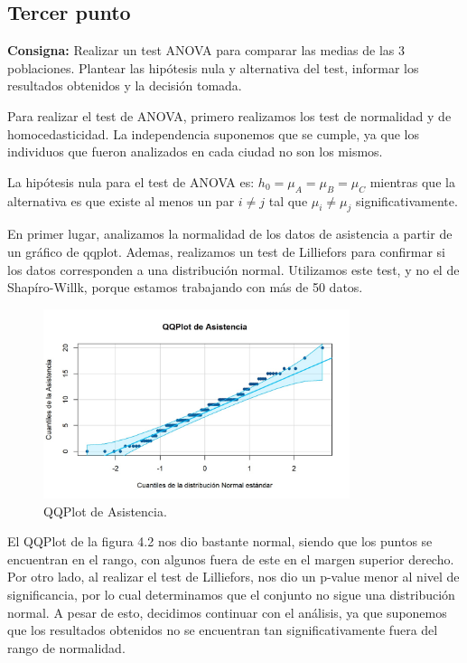 \documentclass{article} %
\begin{document}
\subsection{Tercer punto}

\textbf{Consigna:} Realizar un test ANOVA para comparar las medias de las 3 poblaciones. Plantear las hipótesis nula y alternativa del test, informar los resultados obtenidos y la decisión tomada.

Para realizar el test de ANOVA, primero realizamos los test de normalidad y de homocedasticidad. La independencia suponemos que se cumple, ya que los individuos que fueron analizados en cada ciudad no son los mismos. 

La hipótesis nula para el test de ANOVA es: $h_0=\mu_A=\mu_B=\mu_C$ mientras que la alternativa es que existe al menos un par $i\neq j$ tal que $\mu_i \neq \mu _j$ significativamente.

En primer lugar, analizamos la normalidad de los datos de asistencia a partir de un gráfico de qqplot. Ademas, realizamos un test de Lilliefors para confirmar si los datos corresponden a una distribución normal. Utilizamos este test, y no el de Shapíro-Willk, porque estamos trabajando con más de 50 datos.

\begin{figure}[H]
	\centering
	\includegraphics[width=0.8\textwidth]{images/4-3 qq}
	\caption{QQPlot de Asistencia.}
	\label{fig:qq}
\end{figure}

El QQPlot de la figura 4.2 nos dio bastante normal, siendo que los puntos se encuentran en el rango, con algunos fuera de este en el margen superior derecho. Por otro lado, al realizar el test de Lilliefors, nos dio un p-value menor al nivel de significancia, por lo cual determinamos que el conjunto no sigue una distribución normal. A pesar de esto, decidimos continuar con el análisis, ya que suponemos que los resultados obtenidos no se encuentran tan significativamente fuera del rango de normalidad. 
\end{document}
